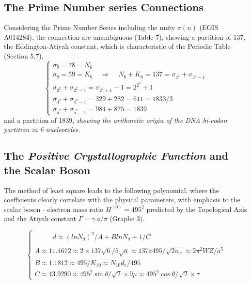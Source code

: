 \documentclass[a4paper,9pt]{article}
\newcounter{row}
\begin{document}

\subsection{The Prime Number series Connections}
Considering the Prime Number Series including the unity $\sigma(n)$ (EOIS A014284), the connection are unambiguous (Table 7), showing a partition of 137, the Eddington-Atiyah constant, which is characteristic of the Periodic Table (Section 5.7),
\begin{equation}
 \left\{
    \begin{array}{ll}
        \sigma_9 = 78 = N_6\\
        \sigma_8 = 59 = K_6  ~~~~~\Rightarrow ~~~~~ N_6 + K_6 = 137 = \sigma_{3^2} + \sigma_{3^2-1}\\
        \sigma_{2^2} + \sigma_{2^2-1} = \sigma_{2^2+1} - 1 = 2^{2^2}+1 \\ 
        \sigma_{4^2} + \sigma_{4^2-1} = 329 + 282 = 611 = 1833/3  \\ 
        \sigma_{5^2} + \sigma_{5^2-1} = 984 + 875 = 1839 
    \end{array}
\right.
\end{equation}
 and a partition of 1839, \textit{showing the arithmetic origin of the DNA bi-codon partition in 6 nucleotides.}



\subsection{The \textit{Positive Crystallographic Function} and the Scalar Boson}

The method of least square leads to the following polynomial, where the coefficients clearly correlate with the physical parameters, with emphasis to the scalar boson - electron mass ratio $H^{(0)} = 495^2$ predicted by the Topological Axis and the Atiyah constant $\Gamma = \gamma~a/\pi$ (Graphe 3).

\begin{equation}
 \left\{
    \begin{array}{ll}
        ~~~~~~~~~~~~ d \approx (lnN_d)^2/A + BlnN_d + 1/C\\
        \\
        A\approx 11.4672 \approx 2\times 137 \sqrt 6/5 \sqrt a\approx 137a495/\sqrt{2a_w}  \approx 2\pi^2WZ/a^5\\ 
        B \approx 1.1812 \approx 495/K_{10} \approx N_{10}d_e/495   \\ 
        C\approx 43.9290 \approx 495^2 \sin \theta/\sqrt2 \times 9\mu  \approx 495^2 \cos \theta/\sqrt2\times \tau
    \end{array}
\right.
\end{equation}
\end{document}
